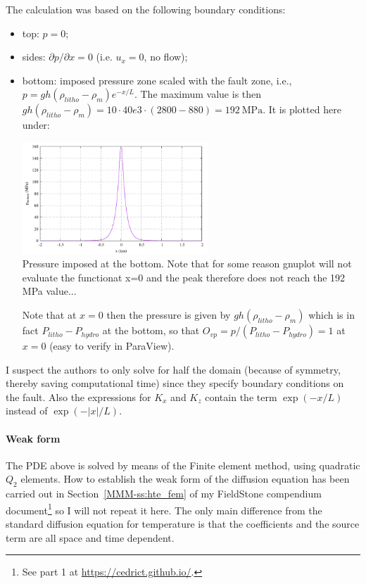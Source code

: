 The calculation was based on the following boundary conditions: 
\begin{itemize}
\item top: $p=0$;
\item sides:  $\partial p/\partial x =0$ (i.e. $u_x=0$, no flow);
\item bottom: imposed pressure zone scaled
with the fault zone, i.e., $p = g h (\rho_{litho} -\rho_m) e^{-x/L}$.
The maximum value is then $g h (\rho_{litho} -\rho_m) 
=10\cdot 40e3 \cdot(2800-880)=192~\si{\mega\pascal}$.
It is plotted here under: 
\begin{center}
\includegraphics[width=7cm]{python_codes/fieldstone_126/images/pbottom}\\
{\captionfont Pressure imposed at the bottom. Note that for some reason 
gnuplot will not evaluate the functionat x=0 and the peak therefore does not 
reach the 192 MPa value...}
\end{center}

Note that at $x=0$ then the pressure is given by $g h (\rho_{litho} -\rho_m)$
which is in fact $P_{litho}-P_{hydro}$ at the bottom, so that $O_{vp}=p/(P_{litho}-P_{hydro})=1$
at $x=0$ (easy to verify in ParaView). 

\end{itemize}
I suspect the authors to only solve for half the domain (because of symmetry, thereby 
saving computational time) since they 
specify boundary conditions on the fault. Also the expressions for $K_x$ and $K_z$ 
contain the term $\exp(-x/L)$ instead of $\exp(-|x|/L)$.

\paragraph{Weak form}

The PDE above is solved by means of the Finite element method, using 
quadratic $Q_2$ elements.
How to establish the weak form of the diffusion equation has been 
carried out in Section~\ref{MMM-ss:hte_fem} of my FieldStone compendium 
document\footnote{See part 1 at \url{https://cedrict.github.io/}.}
so I will not repeat it here. 
The only main difference from the standard diffusion equation for temperature
is that the coefficients and the source term are all space and time dependent.

